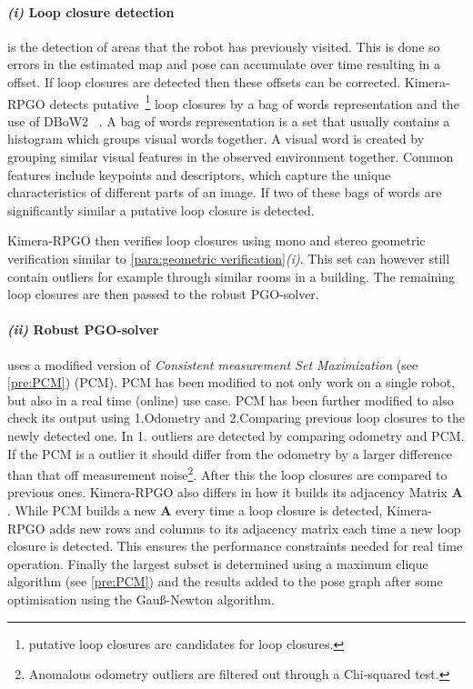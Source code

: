 \documentclass[11pt,a4paper]{article}
\newcommand{\M}[1]{\mathbf{#1}}
\begin{document}
\paragraph{\textit{(i)} Loop closure detection}
is the detection of areas that the robot has previously visited.
This is done so errors in the estimated map and pose can accumulate over time resulting in a offset.
If loop closures are detected then these offsets can be corrected. 
Kimera-RPGO detects putative~\footnote{putative loop closures are candidates for loop closures.} loop closures by a bag of words representation and the use of DBoW2~\cite{dbow2} . 
A bag of words representation is a set that usually contains a histogram which groups visual words together. 
A visual word is created by grouping similar visual features in the observed environment together.
Common features include keypoints and descriptors, which capture the unique characteristics of different parts of an image. 
If two of these bags of words are significantly similar a putative loop closure is detected. 

Kimera-RPGO then verifies loop closures using mono and stereo geometric verification similar to \ref{para:geometric verification}\textit{(i)}. This set can however still contain outliers for example through similar rooms in a building.
The remaining loop closures are then passed to the robust PGO-solver.

\paragraph{\textit{(ii)} Robust PGO-solver} uses a modified version of \textit{Consistent measurement Set Maximization} (see \ref{pre:PCM}) (PCM). PCM has been modified to not only work on a single robot, but also in a real time (online) use case.
PCM has been further modified to also check its output using 1.Odometry and 2.Comparing previous loop closures to the newly detected one. 
In 1. outliers are detected by comparing odometry and PCM. 
If the PCM is a outlier it should differ from the odometry by a larger difference than that off measurement noise\footnote{Anomalous odometry outliers are filtered out through a Chi-squared test.}. After this the loop closures are compared to previous ones. 
Kimera-RPGO also differs in how it builds its adjacency Matrix $\M{A}$.
While PCM builds a new $\M{A}$ every time a loop closure is detected, Kimera-RPGO adds new rows and columns to its adjacency matrix each time a new loop closure is detected. This ensures the performance constraints needed for real time operation.
Finally the largest subset is determined using a maximum clique algorithm (see \ref{pre:PCM}) and the results added to the pose graph after some optimisation using the Gauß-Newton algorithm.
\end{document}

